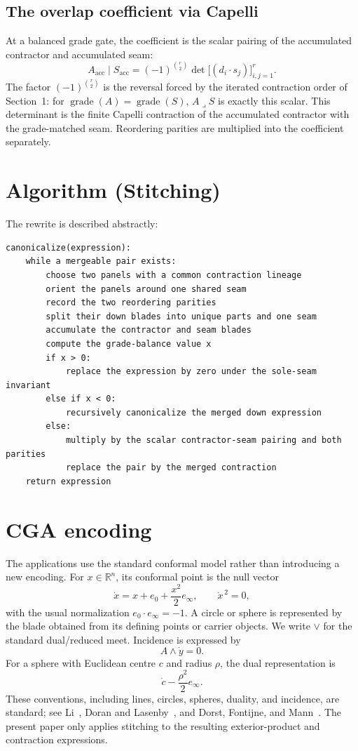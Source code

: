 \documentclass[11pt]{article}
\begin{document}
\subsection{The overlap coefficient via Capelli}

At a balanced grade gate, the coefficient is the scalar pairing of the
accumulated contractor and accumulated seam:
\[
  A_{\mathrm{acc}}\mid S_{\mathrm{acc}}
  =
  (-1)^{\binom r2}\det\bigl[(d_i\cdot s_j)\bigr]_{i,j=1}^{r}.
\]
The factor \((-1)^{\binom r2}\) is the reversal forced by the iterated
contraction order of Section~1: for \(\operatorname{grade}(A)=\operatorname{grade}(S)\),
\(A\mathbin{\lrcorner}S\) is exactly this scalar. This determinant is the finite Capelli contraction of the accumulated
contractor with the grade-matched seam. Reordering parities are multiplied
into the coefficient separately.

\section{Algorithm (Stitching)}

The rewrite is described abstractly:

\begin{lstlisting}
canonicalize(expression):
    while a mergeable pair exists:
        choose two panels with a common contraction lineage
        orient the panels around one shared seam
        record the two reordering parities
        split their down blades into unique parts and one seam
        accumulate the contractor and seam blades
        compute the grade-balance value x
        if x > 0:
            replace the expression by zero under the sole-seam invariant
        else if x < 0:
            recursively canonicalize the merged down expression
        else:
            multiply by the scalar contractor-seam pairing and both parities
            replace the pair by the merged contraction
    return expression
\end{lstlisting}

\section{CGA encoding}

The applications use the standard conformal model rather than introducing a
new encoding. For \(x\in\mathbb R^n\), its conformal point is the null vector
\[
\dot{x}=x+e_0+\frac{x^2}{2}e_\infty,
\qquad
\dot{x}^{\,2}=0,
\]
with the usual normalization \(e_0\cdot e_\infty=-1\). A circle or sphere is
represented by the blade obtained from its defining points or carrier
objects. We write \(\vee\) for the standard dual/reduced meet. Incidence is
expressed by
\[
A\wedge\dot y=0.
\]
For a sphere with Euclidean centre \(c\) and radius \(\rho\), the dual
representation is
\[
\dot c-\frac{\rho^2}{2}e_\infty.
\]
These conventions, including lines, circles, spheres, duality, and incidence,
are standard; see Li~\cite{li2026}, Doran and Lasenby~\cite{doran2003}, and
Dorst, Fontijne, and Mann~\cite{dorst2007}. The present paper only applies
stitching to the resulting exterior-product and contraction expressions.
\end{document}
